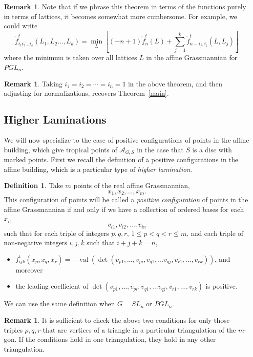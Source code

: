 \documentclass[10pt]{amsart}
\theoremstyle{definition}
\newtheorem{definition}[theorem]{Definition}
\newtheorem{rema}[theorem]{Remark}
\newcommand{\A}{\mathcal{A}}
\newcommand{\val}{\operatorname{val}}
\begin{document}
\begin{rema} Note that if we phrase this theorem in terms of the functions purely in terms of lattices, it becomes somewhat more cumbersome. For example, we could write
\[
\tilde{f}^t_{i_1i_2\dots i_k}(L_1,L_2\dots,L_k) = \min_{L} \left[(-n+1)\tilde{f}_n^t(L) + \sum_{j=1}^k \tilde{f}^t_{n-i_j, i_j}(L,L_j) \right]
\]
where the minimum is taken over all lattices $L$ in the affine Grassmannian for $PGL_n$.
\end{rema}

\begin{rema} Taking $i_1=i_2=\cdots=i_n=1$ in the above theorem, and then adjusting for normalizations, recovers Theorem~\ref{main}.
\end{rema}

\subsection{Higher Laminations}

We will now specialize to the case of positive configurations of points in the affine building, which give tropical points of $\A_{G,S}$ in the case that $S$ is a disc with marked points. First we recall the definition of a positive configurations in the affine building, which is a particular type of \emph{higher lamination}.

\begin{definition} Take $m$ points of the real affine Grassmannian, 
\[
x_1, x_2, \dots, x_m.
\]
This configuration of points will be called a \emph{positive configuration} of points in the affine Grassmannian if and only if we have a collection of ordered bases for each $x_i$,
\[
v_{i1}, v_{i2}, \dots, v_{in}
\]
such that for each triple of integers $p, q, r$, $1 \leq p < q < r \leq m$, and each triple of non-negative integers $i, j, k$ such that $i+j+k=n$,
\begin{itemize}
\item $f_{ijk}^t (x_p,x_q,x_r) = -\val(\det(v_{p1}, \dots, v_{pi}, v_{q1}, \dots v_{qj}, v_{r1}, \dots, v_{rk}))$, and moreover
\item the leading coefficient of $\det(v_{p1}, \dots, v_{pi}, v_{q1}, \dots v_{qj}, v_{r1}, \dots, v_{rk})$ is positive.
\end{itemize}
\end{definition}

We can use the same definition when $G=SL_n$ or $PGL_n$.

\begin{rema} It is sufficient to check the above two conditions for only those triples $p, q, r$ that are vertices of a triangle in a particular triangulation of the $m$-gon. If the conditions hold in one triangulation, they hold in any other triangulation.
\end{rema}
\end{document}
